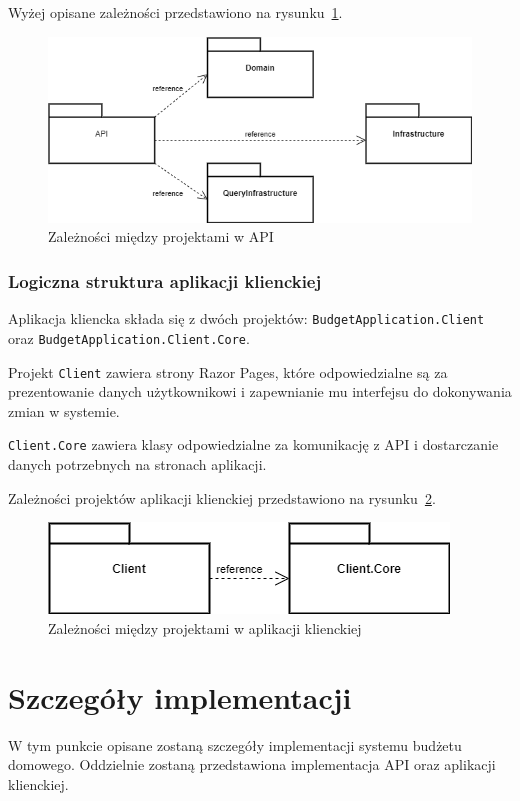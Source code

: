 Wyżej opisane zależności przedstawiono na rysunku~\ref{fig:api-arch}. 

\begin{figure}[t]
	\centering
	\includegraphics[width=.6\linewidth]{rys04/api-arch.png}
	\caption{Zależności między projektami w API}
	\label{fig:api-arch}
\end{figure}

\subsubsection{Logiczna struktura aplikacji klienckiej}

Aplikacja kliencka składa się z dwóch projektów: \texttt{BudgetApplication.Client} oraz \texttt{BudgetApplication.Client.Core}. 

Projekt \texttt{Client} zawiera strony Razor Pages, które odpowiedzialne są za prezentowanie danych użytkownikowi i zapewnianie mu interfejsu do dokonywania zmian w systemie.

\texttt{Client.Core} zawiera klasy odpowiedzialne za komunikację z API i dostarczanie danych potrzebnych na stronach aplikacji.

Zależności projektów aplikacji klienckiej przedstawiono na rysunku~\ref{fig:client-arch}.

\begin{figure}[t]
	\centering
	\includegraphics[width=.6\linewidth]{rys04/client-arch.png}
	\caption{Zależności między projektami w aplikacji klienckiej}
	\label{fig:client-arch}
\end{figure}

\section{Szczegóły implementacji}
\label{sec:szczegoly-implementacji}

W tym punkcie opisane zostaną szczegóły implementacji systemu budżetu domowego. Oddzielnie zostaną przedstawiona implementacja API oraz aplikacji klienckiej. 

